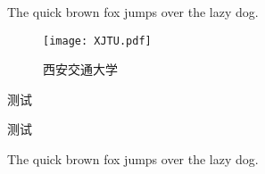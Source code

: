 %
%
%
%
%
%
%
%


        The quick brown fox jumps over the lazy dog.

        \begin{figure}[h!]
          \centering
          \texttt{[image: XJTU.pdf]}
          \caption{西安交通大学}
          \label{fig:in-appendix}
        \end{figure}


            测试


                测试



        The quick brown fox jumps over the lazy dog.
